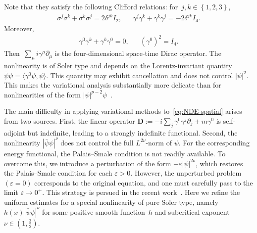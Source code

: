 \documentclass[11pt,final]{amsart}
\newcommand{\braces}[1]{\left\{#1\right\}} %
\newcommand{\eps}{\varepsilon}
\newcommand{\p}{\partial}
\newcommand{\pD}{\mathbf{D}}
\begin{document}
Note that they satisfy the following Clifford relations: for~$j,k\in\braces{1,2,3}$,
\begin{align}
    \sigma^j\sigma^k+\sigma^k\sigma^j= 2\delta^{jk}I_2, & &
    \gamma^j\gamma^k + \gamma^k\gamma^j= -2\delta^{jk}I_4.
\end{align}
Moreover,
\begin{align}
    \gamma^0\gamma^k + \gamma^k \gamma^0 =0, & &
    (\gamma^0)^2=I_4.
\end{align}
Then~$\sum_{\mu} i\gamma^\mu \p_\mu$ is the four-dimensional space-time Dirac operator. The nonlinearity is of Soler type and depends on the Lorentz-invariant quantity $\bar\psi\psi=\langle\gamma^0\psi,\psi\rangle$. This quantity may exhibit cancellation and does not control $|\psi|^2$. This makes the variational analysis substantially more delicate than for nonlinearities of the form $|\psi|^{p-2}\psi$~\cite{DingRuf2012Existence,DingWei2008Stationary,ZhangQinZhao2012Multiple,ZhangZhangZhao2018Existence}.


The main difficulty in applying variational methods to~\eqref{eq:NDE-spatial} arises from two sources. First, the linear operator $\pD := -i\sum_j \gamma^0\gamma^j\partial_j + m\gamma^0$ is self-adjoint but indefinite, leading to a strongly indefinite functional. Second, the nonlinearity $|\bar{\psi}\psi|^\nu$ does not control the full $L^{2\nu}$-norm of $\psi$. For the corresponding energy functional, the Palais--Smale condition is not readily available. To overcome this, we introduce a perturbation of the form $-\eps |\psi|^{2\nu}$, which restores the Palais--Smale condition for each $\eps>0$. However, the unperturbed problem $(\eps=0)$ corresponds to the original equation, and one must carefully pass to the limit $\eps\to0^+$.
This strategy is persued in the recent work~\cite{WZ2026splitting,WZ2026Stationary}.
Here we refine the uniform estimates for a special nonlinearity of pure Soler type, namely~$h(x)|\bar{\psi}\psi|^\nu$ for some positive smooth function~$h$ and subcritical exponent~$\nu\in(1,\frac{3}{2})$. 
\end{document}
